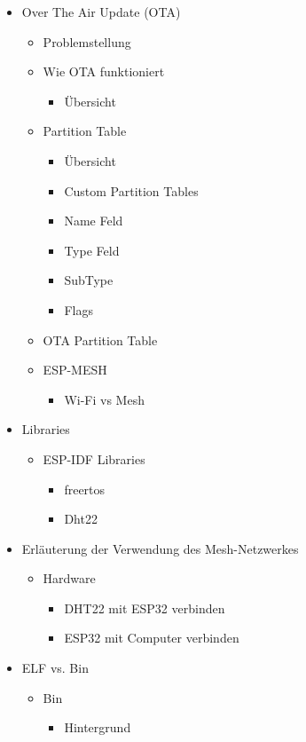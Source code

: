 \begin{itemize}
\begin{itemize}
		\item Over The Air Update (OTA)
		\begin{itemize}
			\item Problemstellung
			\item Wie OTA funktioniert
			\begin{itemize}
				\item Übersicht
			\end{itemize}
			\item Partition Table
			\begin{itemize}
				\item Übersicht
				\item Custom Partition Tables
				\item Name Feld
				\item Type Feld
				\item SubType
				\item Flags
			\end{itemize}
			\item OTA Partition Table
			\item ESP-MESH
			\begin{itemize}
				\item Wi-Fi vs Mesh
			\end{itemize}
		\end{itemize}
		\item Libraries
		\begin{itemize}
			\item ESP-IDF Libraries
			\begin{itemize}
				\item freertos
				\item Dht22
			\end{itemize}
		\end{itemize}
		\item Erläuterung der Verwendung des Mesh-Netzwerkes
		\begin{itemize}
			\item Hardware
			\begin{itemize}
				\item DHT22 mit ESP32 verbinden
				\item ESP32 mit Computer verbinden
			\end{itemize} 
		\end{itemize}
		\item ELF vs. Bin
		\begin{itemize}
			\item Bin
			\begin{itemize}
				\item Hintergrund

\end{itemize}
\end{itemize}
\end{itemize}
\end{itemize}
